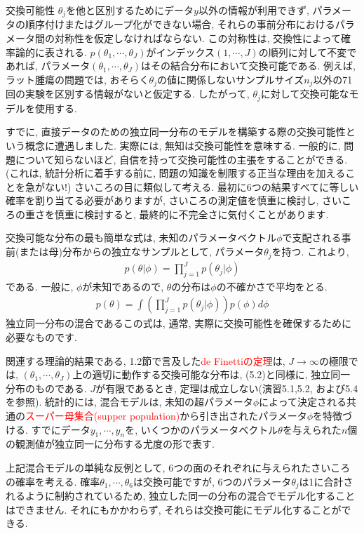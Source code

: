 \documentclass[10pt,dvipdfmx,a4]{beamer}
\newcommand{\eq}[1]{\begin{align}#1\end{align}}
\newcommand{\tcr}[1]{\textcolor{red}{#1}}
\begin{document}
\begin{frame}{交換可能性}
$\theta_j$を他と区別するためにデータ$y$以外の情報が利用できず, パラメータの順序付けまたはグループ化ができない場合, それらの事前分布におけるパラメータ間の対称性を仮定しなければならない.
この対称性は, 交換性によって確率論的に表される.
$p(\theta_1,\cdots,\theta_J)$がインデックス$(1,\cdots,J)$の順列に対して不変であれば, パラメータ$(\theta_1,\cdots,\theta_J)$はその結合分布において交換可能である.
例えば, ラット腫瘍の問題では, おそらく$\theta_j$の値に関係しないサンプルサイズ$n_j$以外の71回の実験を区別する情報がないと仮定する.
したがって, $\theta_j$に対して交換可能なモデルを使用する.

すでに, 直接データのための独立同一分布のモデルを構築する際の交換可能性という概念に遭遇しました.
実際には, 無知は交換可能性を意味する.
一般的に, 問題について知らないほど, 自信を持って交換可能性の主張をすることができる.
(これは, 統計分析に着手する前に, 問題の知識を制限する正当な理由を加えることを急がない!)
さいころの目に類似して考える.
最初に6つの結果すべてに等しい確率を割り当てる必要がありますが, さいころの測定値を慎重に検討し, さいころの重さを慎重に検討すると, 最終的に不完全さに気付くことがあります.
\end{frame}


\begin{frame}
交換可能な分布の最も簡単な式は, 未知のパラメータベクトル$\phi$で支配される事前(または母)分布からの独立なサンプルとして, パラメータ$\theta_j$を持つ.
これより,
\eq{p(\theta|\phi)=\prod_{j=1}^J p(\theta_j|\phi)}
である.
一般に, $\phi$が未知であるので, $\theta$の分布は$\phi$の不確かさで平均をとる.
\eq{p(\theta)=\int \left(\prod_{j=1}^Jp(\theta_j|\phi)\right)p(\phi)d\phi}
独立同一分布の混合であるこの式は, 通常, 実際に交換可能性を確保するために必要なものです.
\end{frame}


\begin{frame}
関連する理論的結果である, 1.2節で言及した\tcr{de Finettiの定理}は, $J\rightarrow \infty$の極限では, $(\theta_1,\cdots,\theta_J)$上の適切に動作する交換可能な分布は, (5.2)と同様に, 独立同一分布のものである.
$J$が有限であるとき, 定理は成立しない(演習5.1,5.2, および5.4を参照).
統計的には, 混合モデルは, 未知の超パラメータ$\phi$によって決定される共通の\tcr{スーパー母集合(supper population)}から引き出されたパラメータ$\phi$を特徴づける.
すでにデータ$y_1,\cdots,y_n$を, いくつかのパラメータベクトル$\theta$を与えられた$n$個の観測値が独立同一に分布する尤度の形で表す.

上記混合モデルの単純な反例として, 6つの面のそれぞれに与えられたさいころの確率を考える.
確率$\theta_1,\cdots,\theta_6$は交換可能ですが, 6つのパラメータ$\theta_j$は1に合計されるように制約されているため, 独立した同一の分布の混合でモデル化することはできません.
それにもかかわらず, それらは交換可能にモデル化することができる.
\end{frame}
\end{document}
